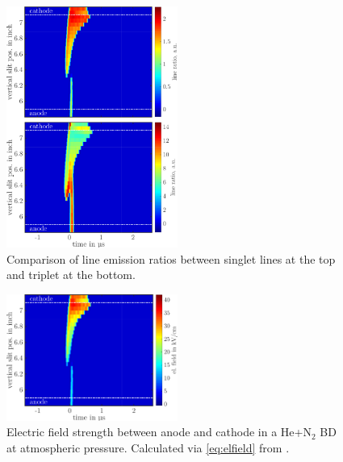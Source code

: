 \documentclass[a4paper,10pt,twoside]{article}
\begin{document}
				\begin{figure}
					\centering
					\hspace{-0.5cm}\includegraphics[width=0.5\textwidth]{figures/lineratio/combinations/lineratio667over706.pdf}
					\caption{Comparison of line emission ratios between singlet lines at the top and triplet at the bottom.}
					\label{img:comparisonlineratio}
				\end{figure}
				
				\begin{figure}
					\centering
					\hspace{0.5cm}\includegraphics[width=0.5\textwidth]{figures/lineratio/combinations/electricfield667.pdf}
					\caption{Electric field strength between anode and cathode in a He+N$_2$ BD at atmospheric pressure. Calculated via \autoref{eq:elfield} from \cite{linratio1_14}.}
					\label{img:elfield667}
				\end{figure}
		
\end{document}
